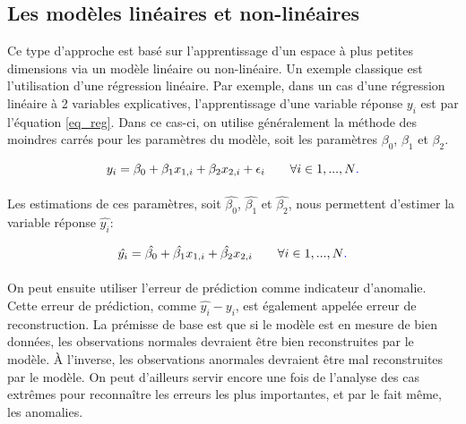 \subsection{Les modèles linéaires et non-linéaires} \label{soussec:linear}

Ce type d'approche est basé sur l'apprentissage d'un espace à plus petites dimensions via un modèle linéaire ou non-linéaire. Un exemple classique est l'utilisation d'une régression linéaire. Par exemple, dans un cas d'une régression linéaire à 2 variables explicatives, l'apprentissage d'une variable réponse $y_i$ est \DIFdelbegin {}\DIFdelend \DIFaddbegin {}\DIFaddend par l'équation \ref{eq_reg}. Dans ce cas-ci, on utilise généralement la méthode des moindres carrés pour \DIFdelbegin {}\DIFdelend \DIFaddbegin {}\DIFaddend les paramètres \DIFdelbegin {}\DIFdelend du modèle, soit les paramètres $\beta_0$, $\beta_1$ et $\beta_2$.

\begin{gather}  \label{eq_reg}
y_i = \beta_0 + \beta_{1} x_{1,i} + \beta_2 x_{2,i} + \epsilon_{i} \qquad \forall i \in {1,...,N}\DIFaddbegin \DIFadd{.
}\DIFaddend \end{gather}

Les estimations de ces paramètres, soit $\hat{\beta_0}$, $\hat{\beta_1}$ et $\hat{\beta_2}$, nous permettent d'estimer la variable réponse $\hat{y_i}$: 

\begin{gather}  \label{eq_reghat}
\hat{y_i} = \hat{\beta_0} + \hat{\beta_{1}} x_{1,i} + \hat{\beta_2} x_{2,i} \qquad \forall i \in {1,...,N}\DIFaddbegin \DIFadd{.
}\DIFaddend \end{gather}

On peut ensuite utiliser l'erreur de prédiction comme indicateur d'anomalie. Cette erreur de prédiction, \DIFdelbegin {}\DIFdelend \DIFaddbegin {}\DIFaddend comme $\hat{y_i} - y_i$, est également appelée erreur de reconstruction. La prémisse de base est que si le modèle est en mesure de bien \DIFdelbegin {}\DIFdelend \DIFaddbegin {}\DIFaddend données, les observations normales devraient être bien reconstruites par le modèle. À l'inverse, les observations anormales devraient être mal reconstruites par le modèle.  On peut d'ailleurs \DIFdelbegin {}\DIFdelend \DIFaddbegin {}\DIFaddend servir encore une fois de l'analyse des cas extrêmes pour reconnaître les erreurs les plus importantes, et par le fait même, les anomalies.

